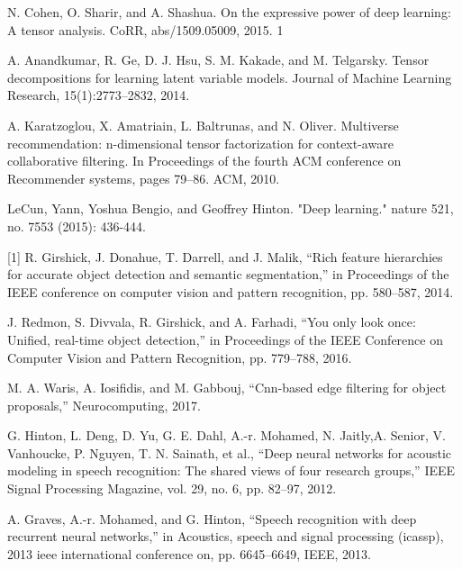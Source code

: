 \documentclass{report}
\begin{document}



\begin{thebibliography}{1}
	
	 N. Cohen, O. Sharir, and A. Shashua. On the expressive power of deep learning: A tensor analysis. CoRR,
	abs/1509.05009, 2015. 1
	
	A. Anandkumar, R. Ge, D. J. Hsu, S. M. Kakade, and
	M. Telgarsky. Tensor decompositions for learning latent
	variable models. Journal of Machine Learning Research,
	15(1):2773–2832, 2014.
	
	 A. Karatzoglou, X. Amatriain, L. Baltrunas, and N. Oliver.
	Multiverse recommendation: n-dimensional tensor factorization for context-aware collaborative filtering. In Proceedings of the fourth ACM conference on Recommender systems,
	pages 79–86. ACM, 2010. 
	
	LeCun, Yann, Yoshua Bengio, and Geoffrey Hinton. "Deep learning." nature 521, no. 7553 (2015): 436-444.
	
[1] R. Girshick, J. Donahue, T. Darrell, and J. Malik, “Rich feature
hierarchies for accurate object detection and semantic segmentation,”
in Proceedings of the IEEE conference on computer vision and pattern
recognition, pp. 580–587, 2014.

J. Redmon, S. Divvala, R. Girshick, and A. Farhadi, “You only look
once: Unified, real-time object detection,” in Proceedings of the IEEE
Conference on Computer Vision and Pattern Recognition, pp. 779–788,
2016.

 M. A. Waris, A. Iosifidis, and M. Gabbouj, “Cnn-based edge filtering
for object proposals,” Neurocomputing, 2017.

	
 G. Hinton, L. Deng, D. Yu, G. E. Dahl, A.-r. Mohamed, N. Jaitly,A. Senior, V. Vanhoucke, P. Nguyen, T. N. Sainath, et al., “Deep neural networks for acoustic modeling in speech recognition: The shared views
	of four research groups,” IEEE Signal Processing Magazine, vol. 29,
	no. 6, pp. 82–97, 2012.
	
	A. Graves, A.-r. Mohamed, and G. Hinton, “Speech recognition with
	deep recurrent neural networks,” in Acoustics, speech and signal processing (icassp), 2013 ieee international conference on, pp. 6645–6649,
	IEEE, 2013.
	

\end{thebibliography}
\end{document}
